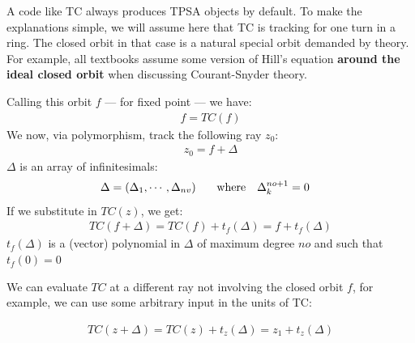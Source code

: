\documentclass{hitec}     %
\begin{document}
{{{{A code like TC always produces TPSA objects by default. To make the explanations simple, we will assume here  that TC is tracking for one turn in a ring. The closed orbit in that case is a natural special orbit demanded by theory. For example, all textbooks assume some version of Hill's equation {\bf around the  ideal closed orbit} when discussing Courant-Snyder theory.


Calling this orbit $f$ --- for fixed point --- we have: 
%
\begin{align} f=TC(f) \label{eq:fixtc} \end{align}
%
We now, via polymorphism, track the following ray $z_0$:
%
\begin{align} {z}_{0}=
f+\Delta  \label{eq:idtpsa}\end{align}
%
%
$\Delta $ is an array of infinitesimals:
%
\begin{align} \Delta &=\left({{\Delta }_{1},\cdots,{\Delta }_{nv}}\right)~~~~~{\rm w}{\rm h}{\rm e}{\rm r}{\rm e}~~~{\Delta }_{k}^{no+1}=
0 \label{eq:nilpot}\end{align}
%
If we substitute  in $TC(z)$, we get:
%
\begin{align} TC(f+\Delta ) =TC(f)+{t}_{f}(\Delta )=f+{t}_{f}(\Delta ) \label{eq:fixtmap} \end{align}
%
${t}_{f}(\Delta )$ is a (vector) polynomial in $\Delta $ of maximum degree $no$ and such that ${t}_{f}(0)=0$

We can evaluate $TC$ at a different ray not involving the closed orbit $f$, for example, we can use some arbitrary input in the units of TC:

%
\begin{align} TC(z+\Delta ) =TC(z)+{t}_{z}(\Delta )={z}_{1}+{t}_{z}(\Delta ) \label{eq:ztmap} \end{align}


}}}}
\end{document}
